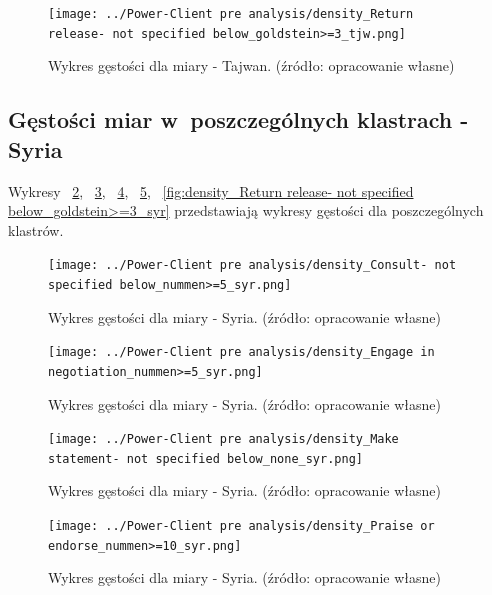 \documentclass[11pt]{report}
\begin{document}
    \begin{figure}[tp]
        \centering
        \texttt{[image: ../Power-Client pre analysis/density\_Return release- not specified below\_goldstein>=3\_tjw.png]}
        \caption{Wykres gęstości dla miary - Tajwan. (źródło: opracowanie własne)}
        \label{fig:density_Return release- not specified below_goldstein>=3_tjw}
    \end{figure}

    \subsection{Gęstości miar w~poszczególnych klastrach - Syria}\label{subsec:gęstośc-miar-w-poszczególnych-klastrach---syria}

    Wykresy
    ~\ref{fig:density_Consult- not specified below_nummen>=5_syr},
    ~\ref{fig:density_Engage in negotiation_nummen>=5_syr},
    ~\ref{fig:density_Make statement- not specified below_none_syr},
    ~\ref{fig:density_Praise or endorse_nummen>=10_syr},
    ~\ref{fig:density_Return release- not specified below_goldstein>=3_syr}
    przedstawiają wykresy gęstości dla poszczególnych klastrów.

    \begin{figure}[tp]
        \centering
        \texttt{[image: ../Power-Client pre analysis/density\_Consult- not specified below\_nummen>=5\_syr.png]}
        \caption{Wykres gęstości dla miary - Syria. (źródło: opracowanie własne)}
        \label{fig:density_Consult- not specified below_nummen>=5_syr}
    \end{figure}

    \begin{figure}[tp]
        \centering
        \texttt{[image: ../Power-Client pre analysis/density\_Engage in negotiation\_nummen>=5\_syr.png]}
        \caption{Wykres gęstości dla miary - Syria. (źródło: opracowanie własne)}
        \label{fig:density_Engage in negotiation_nummen>=5_syr}
    \end{figure}

    \begin{figure}[tp]
        \centering
        \texttt{[image: ../Power-Client pre analysis/density\_Make statement- not specified below\_none\_syr.png]}
        \caption{Wykres gęstości dla miary - Syria. (źródło: opracowanie własne)}
        \label{fig:density_Make statement- not specified below_none_syr}
    \end{figure}

    \begin{figure}[tp]
        \centering
        \texttt{[image: ../Power-Client pre analysis/density\_Praise or endorse\_nummen>=10\_syr.png]}
        \caption{Wykres gęstości dla miary - Syria. (źródło: opracowanie własne)}
        \label{fig:density_Praise or endorse_nummen>=10_syr}
    \end{figure}
\end{document}
